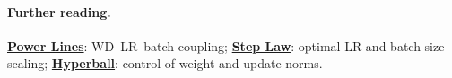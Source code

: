 \paragraph{Further reading.}
\href{https://arxiv.org/abs/2505.13738}{\textbf{Power Lines}}: WD--LR--batch coupling;
\href{https://arxiv.org/abs/2503.04715}{\textbf{Step Law}}: optimal LR and batch-size scaling;
\href{https://arxiv.org/abs/2606.16899}{\textbf{Hyperball}}: control of weight and update norms.
